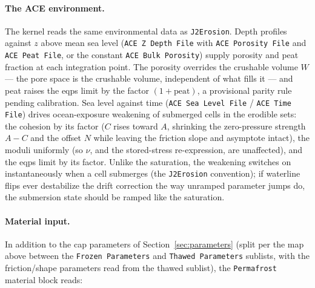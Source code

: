 \documentclass[12pt]{article}
\begin{document}
\paragraph{The ACE environment.}
The kernel reads the same environmental data as \texttt{J2Erosion}.
Depth profiles against $z$ above mean sea level
(\texttt{ACE Z Depth File} with \texttt{ACE Porosity File} and
\texttt{ACE Peat File}, or the constant \texttt{ACE Bulk Porosity})
supply porosity and peat fraction at each integration point. The
porosity overrides the crushable volume $W$ --- the pore space is
the crushable volume, independent of what fills it --- and peat
raises the eqps limit by the factor $(1 + \mathrm{peat})$, a
provisional parity rule pending calibration. Sea level against time
(\texttt{ACE Sea Level File} / \texttt{ACE Time File}) drives
ocean-exposure weakening of submerged cells in the erodible sets:
the cohesion by its factor ($C$ rises toward $A$, shrinking the
zero-pressure strength $A - C$ and the offset $N$ while leaving the
friction slope and asymptote intact), the moduli uniformly (so
$\nu$, and the stored-stress re-expression, are unaffected), and the
eqps limit by its factor. Unlike the saturation, the weakening
switches on instantaneously when a cell submerges (the
\texttt{J2Erosion} convention); if waterline flips ever destabilize
the drift correction the way unramped parameter jumps do, the
submersion state should be ramped like the saturation.

\paragraph{Material input.}
In addition to the cap parameters of Section~\ref{sec:parameters}
(split per the map above between the \texttt{Frozen Parameters} and
\texttt{Thawed Parameters} sublists, with the friction/shape
parameters read from the thawed sublist), the \texttt{Permafrost}
material block reads:
\end{document}
